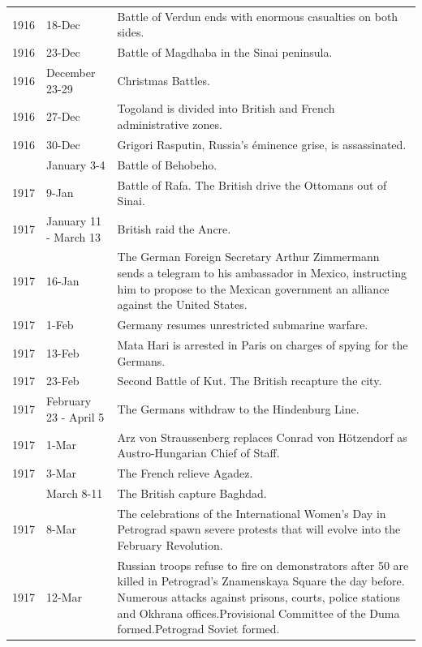 \documentclass[
  openany]{book}
\begin{document}
\begin{longtable}[t]{rl>{\raggedright\arraybackslash}p{22em}}
\addlinespace
\rowcolor{gray!6}  1916 & 18-Dec & Battle of Verdun ends with enormous casualties on both sides.\\
1916 & 23-Dec & Battle of Magdhaba in the Sinai peninsula.\\
\rowcolor{gray!6}  1916 & December 23-29 & Christmas Battles.\\
1916 & 27-Dec & Togoland is divided into British and French administrative zones.\\
\rowcolor{gray!6}  1916 & 30-Dec & Grigori Rasputin, Russia's éminence grise, is assassinated.\\
\addlinespace
1917 & January 3-4 & Battle of Behobeho.\\
\rowcolor{gray!6}  1917 & 9-Jan & Battle of Rafa. The British drive the Ottomans out of Sinai.\\
1917 & January 11 - March 13 & British raid the Ancre.\\
\rowcolor{gray!6}  1917 & 16-Jan & The German Foreign Secretary Arthur Zimmermann sends a telegram to his ambassador in Mexico, instructing him to propose to the Mexican government an alliance against the United States.\\
1917 & 1-Feb & Germany resumes unrestricted submarine warfare.\\
\addlinespace
\rowcolor{gray!6}  1917 & 13-Feb & Mata Hari is arrested in Paris on charges of spying for the Germans.\\
1917 & 23-Feb & Second Battle of Kut. The British recapture the city.\\
\rowcolor{gray!6}  1917 & February 23 - April 5 & The Germans withdraw to the Hindenburg Line.\\
1917 & 1-Mar & Arz von Straussenberg replaces Conrad von Hötzendorf as Austro-Hungarian Chief of Staff.\\
\rowcolor{gray!6}  1917 & 3-Mar & The French relieve Agadez.\\
\addlinespace
1917 & March 8-11 & The British capture Baghdad.\\
\rowcolor{gray!6}  1917 & 8-Mar & The celebrations of the International Women's Day in Petrograd spawn severe protests that will evolve into the February Revolution.\\
1917 & 12-Mar & Russian troops refuse to fire on demonstrators after 50 are killed in Petrograd's Znamenskaya Square the day before. Numerous attacks against prisons, courts, police stations and Okhrana offices.Provisional Committee of the Duma formed.Petrograd Soviet formed.\\

\end{longtable}
\end{document}
